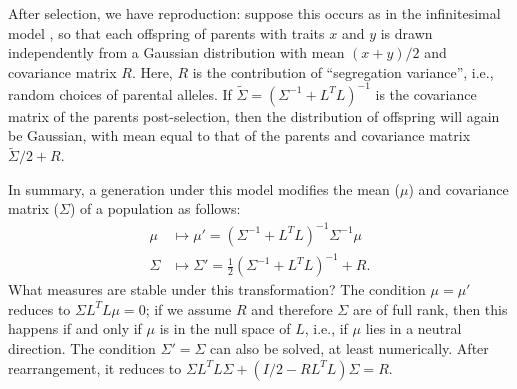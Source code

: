 \documentclass{article}
\newcommand{\1}{\mathbbm{1}}
\begin{document}
After selection, we have reproduction:
suppose this occurs as in the infinitesimal model \citep{barton2016infinitesimal},
so that each offspring of parents with traits $x$ and $y$
is drawn independently from a Gaussian distribution 
with mean $(x+y)/2$ and covariance matrix $R$.
Here, $R$ is the contribution of ``segregation variance'',
i.e., random choices of parental alleles.
If $\widetilde \Sigma = (\Sigma^{-1} + L^T L)^{-1}$ 
is the covariance matrix of the parents post-selection,
then the distribution of offspring will again be Gaussian,
with mean equal to that of the parents
and covariance matrix $\widetilde \Sigma/2 + R$.

In summary, a generation under this model modifies the mean ($\mu$)
and covariance matrix ($\Sigma$) of a population as follows:
\begin{align*}
    \mu &\mapsto \mu' = (\Sigma^{-1}+L^T L)^{-1} \Sigma^{-1} \mu \\
    \Sigma &\mapsto \Sigma' = \frac{1}{2} (\Sigma^{-1} + L^T L)^{-1} + R .
\end{align*}
What measures are stable under this transformation?
The condition $\mu = \mu'$ reduces to $\Sigma L^T L \mu = 0$;
if we assume $R$ and therefore $\Sigma$ are of full rank,
then this happens if and only if $\mu$ is in the null space of $L$,
i.e., if $\mu$ lies in a neutral direction.
The condition $\Sigma' = \Sigma$ can also be solved,
at least numerically.
After rearrangement, it reduces to
$\Sigma L^T L \Sigma + (I/2 - R L^T L) \Sigma = R$.
\end{document}
